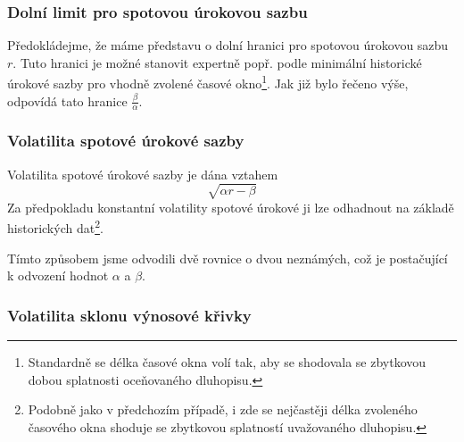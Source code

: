 \documentclass[a4paper]{book}
\begin{document}
\subsubsection{Dolní limit pro spotovou úrokovou sazbu}

Předokládejme, že máme představu o dolní hranici pro spotovou úrokovou sazbu $r$. Tuto hranici je možné stanovit expertně popř. podle minimální historické úrokové sazby pro vhodně zvolené časové okno\footnote{Standardně se délka časové okna volí tak, aby se shodovala se zbytkovou dobou splatnosti oceňovaného dluhopisu.}. Jak již bylo řečeno výše, odpovídá tato hranice $\frac{\beta}{\alpha}$.

\subsubsection{Volatilita spotové úrokové sazby}

Volatilita spotové úrokové sazby je dána vztahem
\begin{equation*}
\sqrt{\alpha r - \beta}
\end{equation*}
Za předpokladu konstantní volatility spotové úrokové ji lze odhadnout na základě historických dat\footnote{Podobně jako v předchozím případě, i zde se nejčastěji délka zvoleného časového okna shoduje se zbytkovou splatností uvažovaného dluhopisu.}.

Tímto způsobem jsme odvodili dvě rovnice o dvou neznámých, což je postačující k odvození hodnot $\alpha$ a $\beta$.

\subsubsection{Volatilita sklonu výnosové křivky}
\end{document}
